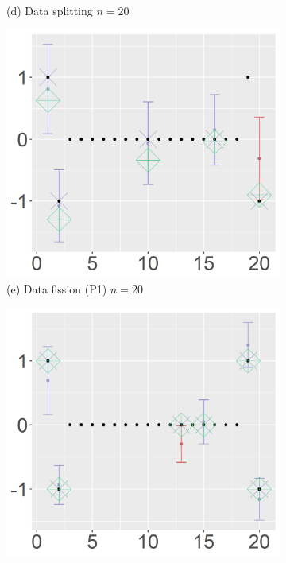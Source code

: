 \begin{figure}[ht!]
\begin{subfigure}[b]{.32\columnwidth}
    \caption{(d) Data splitting $n=20$}
\end{subfigure}
\hfill
\centering
\begin{subfigure}[b]{.32\columnwidth} 
    \includegraphics[width=\columnwidth]{../../plot/p1_20_1_1.png}
    \caption{(e) Data fission (P1) $n=20$}
\end{subfigure}
\hfill
\centering
\begin{subfigure}[b]{.32\columnwidth} 
    \includegraphics[width=\columnwidth]{../../plot/p2_20_1_1.png}

\end{subfigure}
\end{figure}
